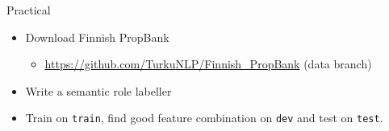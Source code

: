 \documentclass[10pt, compress]{beamer}
\begin{document}

\begin{frame}{Practical}
  
\begin{itemize}
  \item Download Finnish PropBank
  \begin{itemize}
     \item \url{https://github.com/TurkuNLP/Finnish_PropBank} (data branch)
  \end{itemize}
  \item Write a semantic role labeller
  \item Train on {\tt train}, find good feature combination on {\tt dev} and test on {\tt test}.
\end{itemize}

\end{frame}
\end{document}
